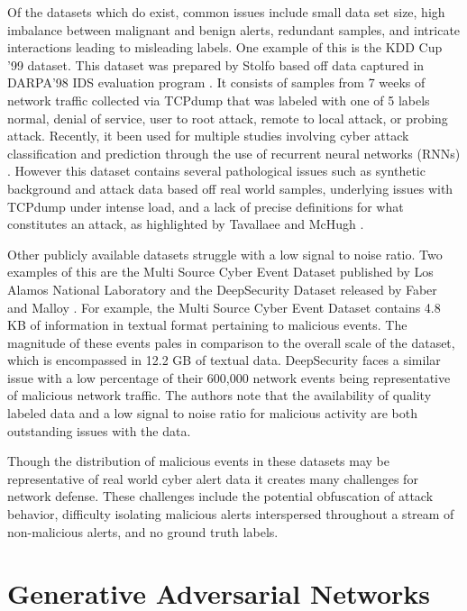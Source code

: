 Of the datasets which do exist, common issues include small data set size, high imbalance between malignant and benign alerts, redundant samples, and intricate interactions leading to misleading labels. One example of this is the KDD Cup '99 \cite{kdd-cup} dataset. This dataset was prepared by Stolfo \etal \cite{Stolfo} based off data captured in DARPA'98 IDS evaluation program \cite{Lippmann}. It consists of samples from 7 weeks of network traffic collected via TCPdump that was labeled with one of 5 labels {normal, denial of service, user to root attack, remote to local attack, or probing attack}. Recently, it been used for multiple studies involving cyber attack classification and prediction through the use of recurrent neural networks (RNNs) \cite{Kim, Staudemeyer}. However this dataset contains several pathological issues such as synthetic background and attack data based off real world samples, underlying issues with TCPdump under intense load, and a lack of precise definitions for what constitutes an attack, as highlighted by Tavallaee \etal \cite{Tavallaee} and McHugh \cite{McHugh}.

Other publicly available datasets struggle with a low signal to noise ratio. Two examples of this are the Multi Source Cyber Event Dataset published by Los Alamos National Laboratory \cite{akent-2015-enterprise-data} and the DeepSecurity Dataset released by Faber and Malloy \cite{Faber2018}. For example, the Multi Source Cyber Event Dataset contains 4.8 KB of information in textual format pertaining to malicious events. The magnitude of these events pales in comparison to the overall scale of the dataset, which is encompassed in  12.2 GB of textual data. DeepSecurity faces a similar issue with a low percentage of their 600,000 network events being representative of malicious network traffic. The authors note that the availability of quality labeled data and a low signal to noise ratio for malicious activity are both outstanding issues with the data. 

Though the distribution of malicious events in these datasets may be representative of real world cyber alert data it creates many challenges for network defense. These challenges include the potential obfuscation of attack behavior, difficulty isolating malicious alerts interspersed throughout a stream of non-malicious alerts, and no ground truth labels. 

\section{Generative Adversarial Networks}

